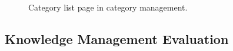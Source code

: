 \documentclass[12pt,oneside,openright,a4paper]{cpe-english-project}
\begin{document}
	\begin{figure}[!h]\centering
		\caption{Category list page in category management.}\label{fig:Category list page in category management_done}
	\end{figure}

	\subsection{Knowledge Management Evaluation}
\end{document}
